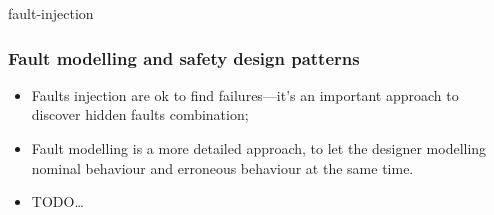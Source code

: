 \documentclass{beamer}
\begin{document}
 {fault-injection}



\begin{frame}
\frametitle{Fault modelling and safety design patterns}
\begin{itemize}
  \item Faults injection are ok to find failures---it's an important approach to discover hidden faults combination;
  \item Fault modelling is a more detailed approach, to let the designer modelling nominal behaviour and erroneous behaviour at the same time.
  \item TODO\ldots 
\end{itemize}
\end{frame}
\end{document}
